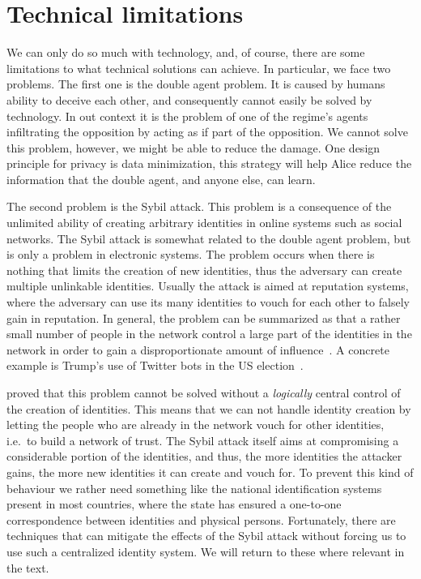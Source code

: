 \section{Technical limitations}

We can only do so much with technology, and, of course, there are some 
limitations to what technical solutions can achieve.
In particular, we face two problems.
The first one is the double agent problem.
It is caused by humans ability to deceive each other, and consequently cannot 
easily be solved by technology.
\label{DoubleAgentProblem}
In out context it is the problem of one of the regime's agents infiltrating the 
opposition by acting as if part of the opposition.
We cannot solve this problem, however, we might be able to reduce the damage.
One design principle for privacy is data minimization, this strategy will help 
Alice reduce the information that the double agent, and anyone else, can learn.

The second problem is the Sybil attack.
This problem is a consequence of the unlimited ability of creating arbitrary 
identities in online systems such as social networks.
\label{SybilAttacks}
The Sybil attack is somewhat related to the double agent problem, but is only 
a problem in electronic systems.
The problem occurs when there is nothing that limits the creation of new 
identities, thus the adversary can create multiple unlinkable identities.
Usually the attack is aimed at reputation systems, where the adversary can use 
its many identities to vouch for each other to falsely gain in reputation.
In general, the problem can be summarized as that a rather small number of 
people in the network control a large part of the identities in the network in 
order to gain a disproportionate amount of influence~\cite{SybilAttack}.
A concrete example is Trump's use of Twitter bots in the US 
election~\cite{BotsAndAutomationDuringUSElection}.

 proved that this problem cannot be solved without 
a \emph{logically} central control of the creation of identities.
This means that we can not handle identity creation by letting the people who 
are already in the network vouch for other identities, i.e.\ to build a network 
of trust.
The Sybil attack itself aims at compromising a considerable portion of the 
identities, and thus, the more identities the attacker gains, the more new 
identities it can create and vouch for.
To prevent this kind of behaviour we rather need something like the national 
identification systems present in most countries, where the state has ensured 
a one-to-one correspondence between identities and physical persons.
Fortunately, there are techniques that can mitigate the effects of the Sybil 
attack without forcing us to use such a centralized identity system.
We will return to these where relevant in the text.
